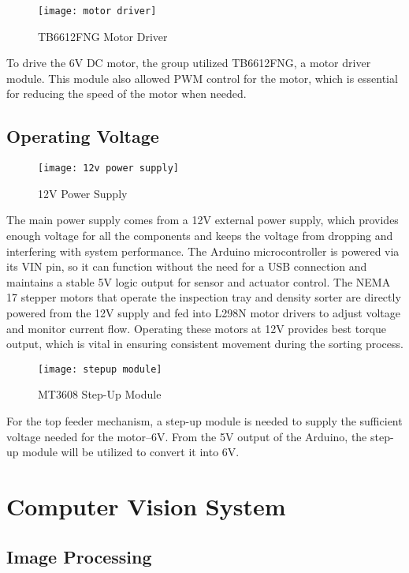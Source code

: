 \begin{figure}[h]
    \centering
    \texttt{[image: motor driver]} %
    \caption{TB6612FNG Motor Driver}
    \label{fig:motor_driver}
\end{figure}

To drive the 6V DC motor, the group utilized TB6612FNG, a motor driver module. This module also allowed PWM control for the motor, which is essential for reducing the speed of the motor when needed. 

\subsection{Operating Voltage}

\begin{figure}[h]
    \centering
    \texttt{[image: 12v power supply]} %
    \caption{12V Power Supply}
    \label{fig:12v_power_supply}
\end{figure}

The main power supply comes from a 12V external power supply, which provides enough voltage for all the components and keeps the voltage from dropping and interfering with system performance. The Arduino microcontroller is powered via its VIN pin, so it can function without the need for a USB connection and maintains a stable 5V logic output for sensor and actuator control. The NEMA 17 stepper motors that operate the inspection tray and density sorter are directly powered from the 12V supply and fed into L298N motor drivers to adjust voltage and monitor current flow. Operating these motors at 12V provides best torque output, which is vital in ensuring consistent movement during the sorting process.

\begin{figure}[h]
    \centering
    \texttt{[image: stepup module]} %
    \caption{MT3608 Step-Up Module}
    \label{fig:mt3608}
\end{figure}

For the top feeder mechanism, a step-up module is needed to supply the sufficient voltage needed for the motor–6V. From the 5V output of the Arduino, the step-up module will be utilized to convert it into 6V.

\section{Computer Vision System}
\subsection{Image Processing}
